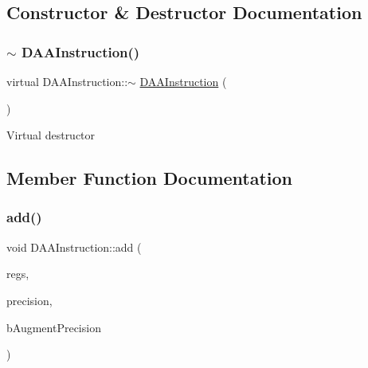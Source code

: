 \subsection{Constructor \& Destructor Documentation}
\mbox{\label{classDAAInstruction_a6db9518dfdbe63ad9853c980244e8cd7}} 
\subsubsection{\texorpdfstring{$\sim$ D\+A\+A\+Instruction()}{~ DAAInstruction()}}
{\footnotesize\ttfamily virtual D\+A\+A\+Instruction\+::$\sim$ \hyperlink{classDAAInstruction}{D\+A\+A\+Instruction} (\begin{DoxyParamCaption}{ }\end{DoxyParamCaption})\hspace{0.3cm}{\ttfamily [pure virtual]}}

Virtual destructor 

\subsection{Member Function Documentation}
\mbox{\label{classDAAInstruction_aa83f60d8f5ffdce5192c9699df67afbb}} 
\subsubsection{\texorpdfstring{add()}{add()}}
{\footnotesize\ttfamily void D\+A\+A\+Instruction\+::add (\begin{DoxyParamCaption}\item[{\hyperlink{DAAInstruction_8h_af0fae93a861de9cf37988d5673cac523}{reg\+Table} \&}]{regs,  }\item[{\hyperlink{DAAInstruction_8h_a0e8cae02815a5f8adc750122d790b455}{reg\+Precision\+Table} \&}]{precision,  }\item[{bool}]{b\+Augment\+Precision }\end{DoxyParamCaption})}

\mbox{\label{classDAAInstruction_aabf28b332cc945a681e3e83492947b7f}} 
